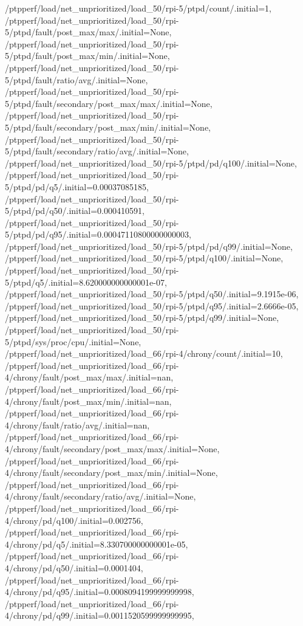 {    /ptpperf/load/net_unprioritized/load_50/rpi-5/ptpd/count/.initial=1,
    /ptpperf/load/net_unprioritized/load_50/rpi-5/ptpd/fault/post_max/max/.initial=None,
    /ptpperf/load/net_unprioritized/load_50/rpi-5/ptpd/fault/post_max/min/.initial=None,
    /ptpperf/load/net_unprioritized/load_50/rpi-5/ptpd/fault/ratio/avg/.initial=None,
    /ptpperf/load/net_unprioritized/load_50/rpi-5/ptpd/fault/secondary/post_max/max/.initial=None,
    /ptpperf/load/net_unprioritized/load_50/rpi-5/ptpd/fault/secondary/post_max/min/.initial=None,
    /ptpperf/load/net_unprioritized/load_50/rpi-5/ptpd/fault/secondary/ratio/avg/.initial=None,
    /ptpperf/load/net_unprioritized/load_50/rpi-5/ptpd/pd/q100/.initial=None,
    /ptpperf/load/net_unprioritized/load_50/rpi-5/ptpd/pd/q5/.initial=0.00037085185,
    /ptpperf/load/net_unprioritized/load_50/rpi-5/ptpd/pd/q50/.initial=0.000410591,
    /ptpperf/load/net_unprioritized/load_50/rpi-5/ptpd/pd/q95/.initial=0.00047110800000000003,
    /ptpperf/load/net_unprioritized/load_50/rpi-5/ptpd/pd/q99/.initial=None,
    /ptpperf/load/net_unprioritized/load_50/rpi-5/ptpd/q100/.initial=None,
    /ptpperf/load/net_unprioritized/load_50/rpi-5/ptpd/q5/.initial=8.620000000000001e-07,
    /ptpperf/load/net_unprioritized/load_50/rpi-5/ptpd/q50/.initial=9.1915e-06,
    /ptpperf/load/net_unprioritized/load_50/rpi-5/ptpd/q95/.initial=2.6666e-05,
    /ptpperf/load/net_unprioritized/load_50/rpi-5/ptpd/q99/.initial=None,
    /ptpperf/load/net_unprioritized/load_50/rpi-5/ptpd/sys/proc/cpu/.initial=None,
    /ptpperf/load/net_unprioritized/load_66/rpi-4/chrony/count/.initial=10,
    /ptpperf/load/net_unprioritized/load_66/rpi-4/chrony/fault/post_max/max/.initial=nan,
    /ptpperf/load/net_unprioritized/load_66/rpi-4/chrony/fault/post_max/min/.initial=nan,
    /ptpperf/load/net_unprioritized/load_66/rpi-4/chrony/fault/ratio/avg/.initial=nan,
    /ptpperf/load/net_unprioritized/load_66/rpi-4/chrony/fault/secondary/post_max/max/.initial=None,
    /ptpperf/load/net_unprioritized/load_66/rpi-4/chrony/fault/secondary/post_max/min/.initial=None,
    /ptpperf/load/net_unprioritized/load_66/rpi-4/chrony/fault/secondary/ratio/avg/.initial=None,
    /ptpperf/load/net_unprioritized/load_66/rpi-4/chrony/pd/q100/.initial=0.002756,
    /ptpperf/load/net_unprioritized/load_66/rpi-4/chrony/pd/q5/.initial=8.330700000000001e-05,
    /ptpperf/load/net_unprioritized/load_66/rpi-4/chrony/pd/q50/.initial=0.0001404,
    /ptpperf/load/net_unprioritized/load_66/rpi-4/chrony/pd/q95/.initial=0.0008094199999999998,
    /ptpperf/load/net_unprioritized/load_66/rpi-4/chrony/pd/q99/.initial=0.0011520599999999995,
}
